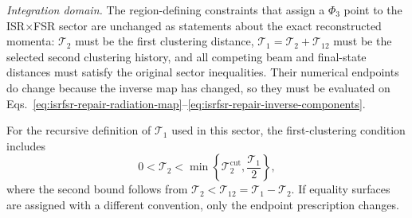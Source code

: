 \documentclass[11pt]{article}
\newcommand{\cut}{\mathrm{cut}}
\newcommand{\Ph}{\Phi}
\begin{document}
\medskip
\noindent
\textit{Integration domain.}
The region-defining constraints that assign a $\Ph_3$ point to the ISR$\times$FSR sector are unchanged as
statements about the exact reconstructed momenta: $\mathcal T_2$ must be the first clustering distance,
$\mathcal T_1=\mathcal T_2+\mathcal T_{12}$ must be the selected second clustering history, and all competing
beam and final-state distances must satisfy the original sector inequalities.  Their numerical endpoints do
change because the inverse map has changed, so they must be evaluated on
Eqs.~\eqref{eq:isrfsr-repair-radiation-map}--\eqref{eq:isrfsr-repair-inverse-components}.

For the recursive definition of $\mathcal T_1$ used in this sector, the first-clustering condition includes
\begin{equation}
0<\mathcal T_2
<
\min\!\left\{
\mathcal T_2^{\cut},\frac{\mathcal T_1}{2}
\right\},
\label{eq:isrfsr-repair-T2-range}
\end{equation}
where the second bound follows from
$\mathcal T_2<\mathcal T_{12}=\mathcal T_1-\mathcal T_2$.  If equality surfaces are assigned with a
different convention, only the endpoint prescription changes.
\end{document}
